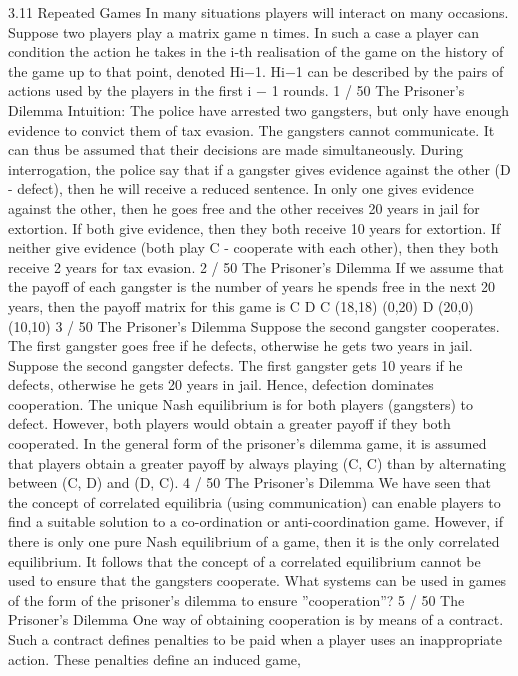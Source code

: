 3.11 Repeated Games
In many situations players will interact on many occasions.
Suppose two players play a matrix game n times.
In such a case a player can condition the action he takes in the i-th
realisation of the game on the history of the game up to that
point, denoted Hi−1.
Hi−1 can be described by the pairs of actions used by the players in
the first i − 1 rounds.
1 / 50
The Prisoner’s Dilemma
Intuition: The police have arrested two gangsters, but only have
enough evidence to convict them of tax evasion. The gangsters
cannot communicate. It can thus be assumed that their decisions
are made simultaneously.
During interrogation, the police say that if a gangster gives
evidence against the other (D - defect), then he will receive a
reduced sentence.
In only one gives evidence against the other, then he goes free and
the other receives 20 years in jail for extortion.
If both give evidence, then they both receive 10 years for extortion.
If neither give evidence (both play C - cooperate with each other),
then they both receive 2 years for tax evasion.
2 / 50
The Prisoner’s Dilemma
If we assume that the payoff of each gangster is the number of
years he spends free in the next 20 years, then the payoff matrix
for this game is
C D
C (18,18) (0,20)
D (20,0) (10,10)
3 / 50
The Prisoner’s Dilemma
Suppose the second gangster cooperates. The first gangster goes
free if he defects, otherwise he gets two years in jail.
Suppose the second gangster defects. The first gangster gets 10
years if he defects, otherwise he gets 20 years in jail.
Hence, defection dominates cooperation. The unique Nash
equilibrium is for both players (gangsters) to defect.
However, both players would obtain a greater payoff if they both
cooperated.
In the general form of the prisoner’s dilemma game, it is assumed
that players obtain a greater payoff by always playing (C, C) than
by alternating between (C, D) and (D, C).
4 / 50
The Prisoner’s Dilemma
We have seen that the concept of correlated equilibria (using
communication) can enable players to find a suitable solution to a
co-ordination or anti-coordination game.
However, if there is only one pure Nash equilibrium of a game,
then it is the only correlated equilibrium.
It follows that the concept of a correlated equilibrium cannot be
used to ensure that the gangsters cooperate.
What systems can be used in games of the form of the prisoner’s
dilemma to ensure ”cooperation”?
5 / 50
The Prisoner’s Dilemma
One way of obtaining cooperation is by means of a contract.
Such a contract defines penalties to be paid when a player uses an
inappropriate action. These penalties define an induced game,
